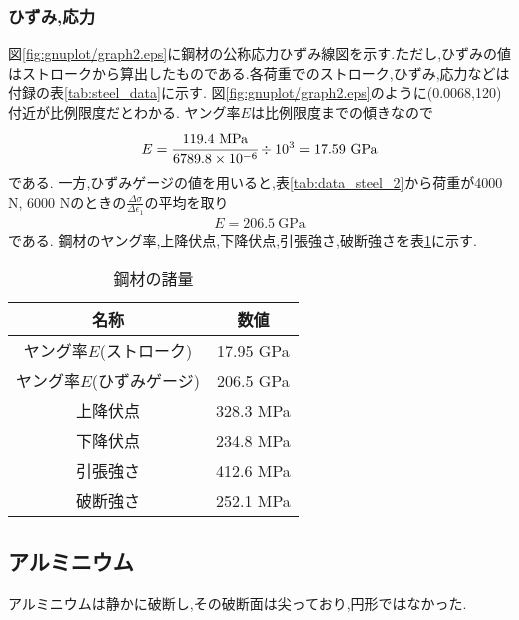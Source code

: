 \subsubsection{ひずみ,応力}
図\ref{fig:gnuplot/graph2.eps}に鋼材の公称応力ひずみ線図を示す.ただし,ひずみの値はストロークから算出したものである.各荷重でのストローク,ひずみ,応力などは付録の表\ref{tab:steel_data}に示す.
図\ref{fig:gnuplot/graph2.eps}のように(0.0068,120)付近が比例限度だとわかる.
ヤング率$E$は比例限度までの傾きなので
\begin{align*}
  E=\cfrac{119.4~\si{\mega\pascal}}{6789.8\times10^{-6}}\div10^{3}=17.59~\si{\giga\pascal}
\end{align*}
である.
一方,ひずみゲージの値を用いると,表\ref{tab:data_steel_2}から荷重が4000 N, 6000 Nのときの$\frac{\Delta\sigma}{\Delta\epsilon_1}$の平均を取り
\begin{align*}
  E=206.5~\si{\giga\pascal}
\end{align*}
である.
鋼材のヤング率,上降伏点,下降伏点,引張強さ,破断強さを表\ref{tab:hagane_ryou}に示す.
\begin{table}[htbp]
   \caption{鋼材の諸量}
   \label{tab:hagane_ryou}
   \centering
   \begin{tabular}{cc}
     \hline
     名称&数値\\
     \hline \hline
     ヤング率$E$(ストローク)&17.95 \si{\giga\pascal}\\
     ヤング率$E$(ひずみゲージ)&206.5 \si{\giga\pascal}\\
     上降伏点&328.3 \si{\mega\pascal}\\
     下降伏点&234.8 \si{\mega\pascal}\\
     引張強さ&412.6 \si{\mega\pascal}\\
     破断強さ&252.1 \si{\mega\pascal}\\
     \hline
   \end{tabular}
\end{table}\newpage
\subsection{アルミニウム}
アルミニウムは静かに破断し,その破断面は尖っており,円形ではなかった.
